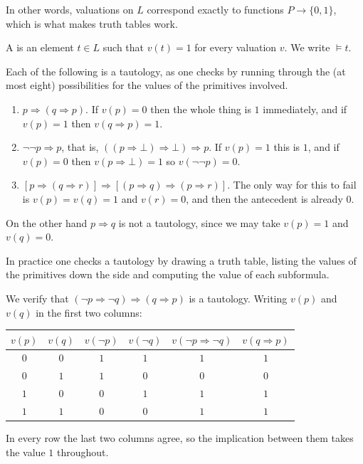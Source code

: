\documentclass[a4paper]{scrartcl}
\begin{document}
In other words, valuations on $L$ correspond exactly to functions $P \to \{0,1\}$, which is what makes truth tables work.

\begin{definition}[Tautology]
  A  is an element $t \in L$ such that $v(t) = 1$ for every valuation $v$. We write $\models t$.
\end{definition}

\begin{example}
  Each of the following is a tautology, as one checks by running through the (at most eight) possibilities for the values of the primitives involved.
  \begin{enumerate}[label=(\roman*)]
    \item $p \Rightarrow (q \Rightarrow p)$. If $v(p) = 0$ then the whole thing is $1$ immediately, and if $v(p) = 1$ then $v(q \Rightarrow p) = 1$.
    \item $\lnot \lnot p \Rightarrow p$, that is, $((p \Rightarrow \bot) \Rightarrow \bot) \Rightarrow p$. If $v(p) = 1$ this is $1$, and if $v(p) = 0$ then $v(p \Rightarrow \bot) = 1$ so $v(\lnot \lnot p) = 0$.
    \item $[p \Rightarrow (q \Rightarrow r)] \Rightarrow [(p \Rightarrow q) \Rightarrow (p \Rightarrow r)]$. The only way for this to fail is $v(p) = v(q) = 1$ and $v(r) = 0$, and then the antecedent is already $0$.
  \end{enumerate}
  On the other hand $p \Rightarrow q$ is not a tautology, since we may take $v(p) = 1$ and $v(q) = 0$.
\end{example}

In practice one checks a tautology by drawing a truth table, listing the values of the primitives down the side and computing the value of each subformula.

\begin{example}
  We verify that $(\lnot p \Rightarrow \lnot q) \Rightarrow (q \Rightarrow p)$ is a tautology. Writing $v(p)$ and $v(q)$ in the first two columns:
  \begin{center}
    \begin{tabular}{cc|cc|cc}
      $v(p)$ & $v(q)$ & $v(\lnot p)$ & $v(\lnot q)$ & $v(\lnot p \Rightarrow \lnot q)$ & $v(q \Rightarrow p)$ \\ \hline
      $0$ & $0$ & $1$ & $1$ & $1$ & $1$ \\
      $0$ & $1$ & $1$ & $0$ & $0$ & $0$ \\
      $1$ & $0$ & $0$ & $1$ & $1$ & $1$ \\
      $1$ & $1$ & $0$ & $0$ & $1$ & $1$ \\
    \end{tabular}
  \end{center}
  In every row the last two columns agree, so the implication between them takes the value $1$ throughout.
\end{example}
\end{document}
